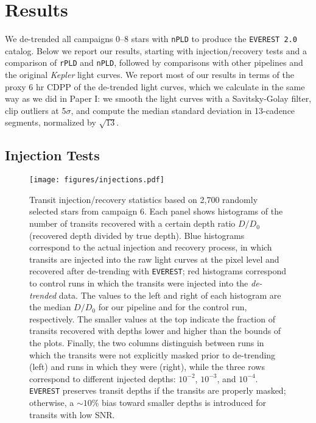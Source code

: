 \documentclass[]{emulateapj}
\begin{document}
\section{Results}
\label{sec:results}

We de-trended all campaigns 0--8 stars with \texttt{nPLD} to produce the
\texttt{EVEREST 2.0} catalog. Below we report our results, starting with
injection/recovery tests and a comparison of \texttt{rPLD} and \texttt{nPLD},
followed by comparisons with other pipelines and the original \emph{Kepler}
light curves. We report most of our results in terms of the proxy 6 hr CDPP of
the de-trended light curves, which we calculate in the same way as we did
in Paper I: we smooth the light curves with a Savitsky-Golay filter, clip
outliers at 5$\sigma$, and compute the median standard deviation in 13-cadence
segments, normalized by $\sqrt{13}$.

\subsection{Injection Tests}
\label{sec:inj}

\begin{figure}[hbt]
  \begin{center}
      \texttt{[image: figures/injections.pdf]}
       \caption{Transit injection/recovery statistics based on 2,700 randomly selected stars from campaign 6.
       Each panel shows histograms of the number of transits recovered with a certain depth
       ratio $D/D_0$ (recovered depth divided by true depth). Blue histograms correspond to the actual
       injection and recovery process, in which transits are injected into the raw light curves at the pixel level
       and recovered after de-trending with \texttt{EVEREST}; red histograms correspond to control runs in which the transits
       were injected into the \emph{de-trended} data. The values
       to the left and right of each histogram are the median $D/D_0$ for our pipeline and for the
       control run, respectively. The smaller values at the top indicate the fraction of transits recovered
       with depths lower and higher than the bounds of the plots. Finally, the two columns distinguish between
       runs in which the transits were not explicitly masked prior to de-trending (left) and runs in which they were (right),
       while the three rows correspond to different injected depths: $10^{−2}$, $10^{−3}$, and $10^{−4}$. \texttt{EVEREST}
       preserves transit depths if the transits are properly masked; otherwise, a ${\sim}10\%$ bias toward smaller depths is
       introduced for transits with low SNR.}
     \label{fig:injections}
  \end{center}
\end{figure}
\end{document}
